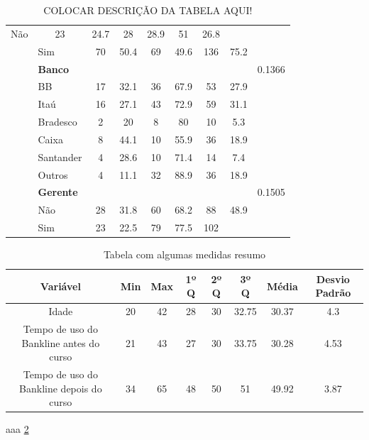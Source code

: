 \documentclass[]{article}
\begin{document}
\begin{table}[t!]
\begin{tabular}{c c c c c c c c c}
                \multicolumn{1}{l}{Não} & 23 & 24.7 & 28 & 28.9 & 51 & 26.8 &  \\
                \multicolumn{1}{c}{}    &
                \multicolumn{1}{l}{Sim}& 70 & 50.4 & 69 & 49.6 & 136 & 75.2  \\ \cmidrule{1-9} &
                \multicolumn{1}{l}{\textbf{Banco}}&  &  &  & & &  & 0.1366\\ \cmidrule{1-9}                
                \multicolumn{1}{c}{}    &
                \multicolumn{1}{l}{BB} & 17 & 32.1 & 36 & 67.9 & 53 & 27.9  \\
                \multicolumn{1}{c}{}    &   
                \multicolumn{1}{l}{Itaú} &16 & 27.1 & 43 & 72.9 & 59 & 31.1  \\
                \multicolumn{1}{c}{}    &
                \multicolumn{1}{l}{Bradesco} & 2 & 20 & 8 & 80 & 10 & 5.3 \\
                \multicolumn{1}{c}{}    &
                \multicolumn{1}{l}{Caixa} & 8 & 44.1 & 10 & 55.9 & 36 & 18.9  \\
                \multicolumn{1}{c}{}    &
                \multicolumn{1}{l}{Santander} & 4 & 28.6 & 10 & 71.4 & 14 & 7.4  \\
                \multicolumn{1}{c}{}    &
                \multicolumn{1}{l}{Outros} & 4 & 11.1 & 32 & 88.9  & 36 & 18.9\\ \cmidrule{1-9} &
                \multicolumn{1}{l}{\textbf{Gerente}} &   &  &  & & &  & 0.1505 \\ \cmidrule{1-9}
                \multicolumn{1}{c}{}    &
                \multicolumn{1}{l}{Não} & 28 & 31.8 & 60 & 68.2 & 88 & 48.9 &  \\
                \multicolumn{1}{c}{}    &
                \multicolumn{1}{l}{Sim}& 23 & 22.5 & 79 & 77.5 & 102  \\
                \midrule
                \bottomrule
        \end{tabular}
        \centering
        \caption{COLOCAR DESCRIÇÃO DA TABELA AQUI!}
        \label{table:tab1}
        \label{tab:sam_count}
\end{table}

\begin{table}[h!]
  \begin{center}
    \begin{tabular}{c|c|c|c|c|c|c|c}
    \hline
      \textbf{Variável} & \textbf{Min} & \textbf{Max} & \textbf{1º Q} & \textbf{2º Q} & \textbf{3º Q} & \textbf{Média}  & \textbf{Desvio Padrão} \\
      \hline
      Idade & 20 & 42 & 28 & 30 & 32.75 & 30.37 & 4.3\\
      Tempo de uso do Bankline antes do curso & 21 & 43 & 27 & 30 & 33.75 & 30.28 & 4.53\\
      Tempo de uso do Bankline depois do curso & 34 & 65 & 48 & 50 & 51 & 49.92 & 3.87 \\ 
      \hline
    \end{tabular}
    \caption{Tabela com algumas medidas resumo}
     \label{table:tab2}
  \end{center}
\end{table}

aaa \ref{table:tab2}
\end{document}
